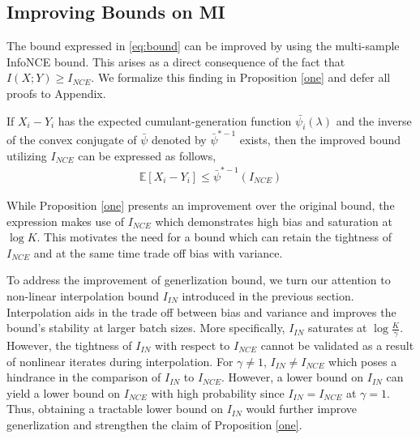 \documentclass{article}
\begin{document}
\subsection{Improving Bounds on MI}
The bound expressed in \autoref{eq:bound} can be improved by using the multi-sample InfoNCE bound. This arises as a direct consequence of the fact that $I(X;Y) \geq I_{NCE}$. We formalize this finding in Proposition \autoref{one} and defer all proofs to Appendix. 
\begin{customthm}{1}\label{one}
  If $X_{i}-Y_{i}$ has the expected cumulant-generation function $\bar{\psi_{i}}(\lambda)$ and the inverse of the convex conjugate of $\bar{\psi}$ denoted by $\bar{\psi}^{*-1}$ exists, then the improved bound utilizing $I_{NCE}$ can be expressed as follows,
\begin{gather}
  \mathbb{E}[X_{i} - Y_{i}] \leq \bar{\psi}^{*-1}(I_{NCE}) \label{eq:newbound}
\end{gather} 
\end{customthm}
While Proposition \autoref{one} presents an improvement over the original bound, the expression makes use of $I_{NCE}$ which demonstrates high bias and saturation at $\log K$. This motivates the need for a bound which can retain the tightness of $I_{NCE}$ and at the same time trade off bias with variance. 

To address the improvement of generlization bound, we turn our attention to non-linear interpolation bound $I_{IN}$ introduced in the previous section. Interpolation aids in the trade off between bias and variance and improves the bound's stability at larger batch sizes. More specifically, $I_{IN}$ saturates at $\log \frac{K}{\gamma}$. However, the tightness of $I_{IN}$ with respect to $I_{NCE}$ cannot be validated as a result of nonlinear iterates during interpolation. For $\gamma\neq 1$, $I_{IN} \neq I_{NCE}$ which poses a hindrance in the comparison of $I_{IN}$ to $I_{NCE}$. However, a lower bound on $I_{IN}$ can yield a lower bound on $I_{NCE}$ with high probability since $I_{IN} = I_{NCE}$ at $\gamma=1$. Thus, obtaining a tractable lower bound on $I_{IN}$ would further improve generlization and strengthen the claim of Proposition \autoref{one}. 
\end{document}
